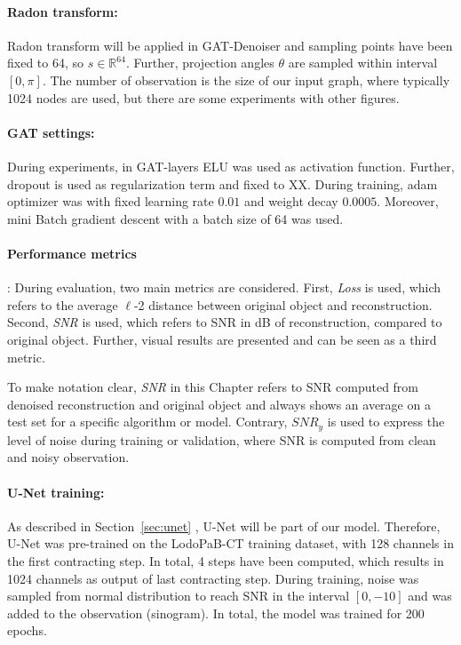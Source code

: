 \paragraph{Radon transform:}
Radon transform will be applied in GAT-Denoiser and sampling points have been fixed to 64, so $s \in \mathbb{R}^64$.
Further, projection angles $\theta$ are sampled within interval $[0, \pi]$.
The number of observation is the size of our input graph, where typically 1024 nodes are used, but 
there are some experiments with other figures.


\paragraph{GAT settings:}
During experiments, in GAT-layers ELU was used as activation function.
Further, dropout is used as regularization term and fixed to XX.
During training, adam optimizer was with fixed learning rate $0.01$ and weight decay $0.0005$.
Moreover, mini Batch gradient descent with a batch size of 64 was used.

\paragraph{Performance metrics}:
During evaluation, two main metrics are considered.
First, \textit{Loss} is used, which refers to the average $\ell$-2 distance between original object and reconstruction.
Second, \textit{SNR} is used, which refers to SNR in dB of reconstruction, compared to original object.
Further, visual results are presented and can be seen as a third metric.

To make notation clear, \textit{SNR} in this Chapter refers to SNR computed from denoised reconstruction and original object 
and always shows an average on a test set for a specific algorithm or model.
Contrary, $\textit{SNR}_y$ is used to express the level of noise during training or validation, 
where SNR is computed from clean and noisy observation.

\paragraph{U-Net training:}
As described in Section~\ref{sec:unet} \textit{}, U-Net will be part of our model.
Therefore, U-Net was pre-trained on the LodoPaB-CT training dataset, with 128 channels in the first contracting step. 
In total, 4 steps have been computed, which results in 1024 channels as output of last contracting step.
During training, noise was sampled from normal distribution to reach SNR in the interval $[0, -10]$ and was added to the observation (sinogram). 
In total, the model was trained for 200 epochs.

